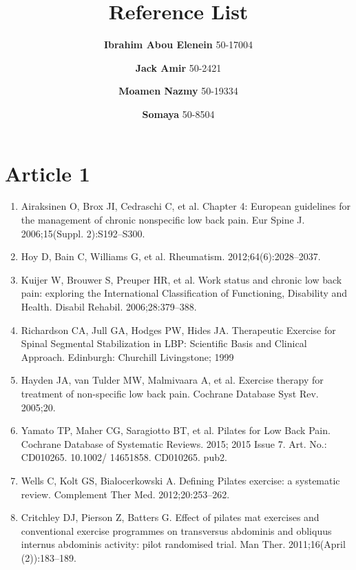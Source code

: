 \documentclass[a5paper]{article}
\theoremstyle{definition}
\begin{document}
\author{
    \textbf{Ibrahim Abou Elenein} 50-17004
  \and
    \textbf{Jack Amir} 50-2421
    \and
    \textbf{Moamen Nazmy} 50-19334
    \and
    \textbf{Somaya} 50-8504
}
\title{\textbf{Reference List}}
\maketitle
\section{Article 1}
\begin{enumerate}
    \item
Airaksinen O, Brox JI, Cedraschi C, et al. Chapter 4: European guidelines for the
management of chronic nonspecific low back pain. Eur Spine J. 2006;15(Suppl.
2):S192–S300.

\item
Hoy D, Bain C, Williams G, et al. Rheumatism. 2012;64(6):2028–2037.



\item
Kuijer W, Brouwer S, Preuper HR, et al. Work status and chronic low back pain:
exploring the International Classification of Functioning, Disability and Health.
Disabil Rehabil. 2006;28:379–388.


\item
Richardson CA, Jull GA, Hodges PW, Hides JA. Therapeutic Exercise for Spinal
Segmental Stabilization in LBP: Scientific Basis and Clinical Approach. Edinburgh:
Churchill Livingstone; 1999


\item
Hayden JA, van Tulder MW, Malmivaara A, et al. Exercise therapy for treatment of
non-specific low back pain. Cochrane Database Syst Rev. 2005;20.


\item
Yamato TP, Maher CG, Saragiotto BT, et al. Pilates for Low Back Pain. Cochrane
Database of Systematic Reviews. 2015; 2015 Issue 7. Art. No.: CD010265. 10.1002/
14651858. CD010265. pub2.


\item
Wells C, Kolt GS, Bialocerkowski A. Defining Pilates exercise: a systematic review.
Complement Ther Med. 2012;20:253–262.


\item
Critchley DJ, Pierson Z, Batters G. Effect of pilates mat exercises and conventional
exercise programmes on transversus abdominis and obliquus internus abdominis activity: pilot randomised trial. Man Ther. 2011;16(April (2)):183–189.



\end{enumerate}
\end{document}
